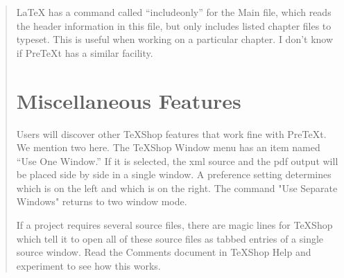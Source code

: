 \documentclass[11pt, oneside]{article}   	%
\begin{document}
\begin{quotation}
LaTeX has a command called ``includeonly'' for the Main file, which reads the header information in this file, but only includes listed chapter files to typeset. This is useful when working on a particular chapter. I don't know if PreTeXt has a similar facility.

\section{Miscellaneous Features}

Users will discover other TeXShop features that work fine with PreTeXt. We mention two here. The TeXShop Window menu has an item named ``Use One Window.'' If it is selected, the xml source and the pdf output will be placed side by side in a single window. A preference setting determines which is on the left and which is on the right. The command "Use Separate Windows" returns to two window mode.

If a project requires several source files, there are magic lines for TeXShop which tell it to open all of these source files as tabbed entries of a single source window. Read the Comments document in TeXShop Help and experiment to see how this works.

\end{quotation}
\end{document}
